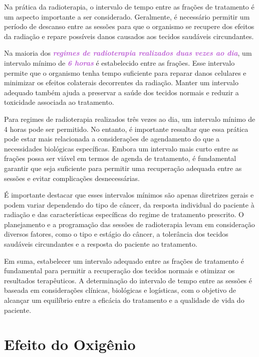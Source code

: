 \documentclass[11pt,a4paper]{article}
\begin{document}
	Na prática da radioterapia, o intervalo de tempo entre as frações de tratamento é um aspecto importante a ser considerado. Geralmente, é necessário permitir um período de descanso entre as sessões para que o organismo se recupere dos efeitos da radiação e repare possíveis danos causados aos tecidos saudáveis circundantes.

	Na maioria dos \textcolor{MediumOrchid}{\textbf{\textit{regimes de radioterapia realizados duas vezes ao dia}}}, um intervalo mínimo de \textcolor{MediumOrchid}{\textbf{\textit{6 horas}}} é estabelecido entre as frações. Esse intervalo permite que o organismo tenha tempo suficiente para reparar danos celulares e minimizar os efeitos colaterais decorrentes da radiação. Manter um intervalo adequado também ajuda a preservar a saúde dos tecidos normais e reduzir a toxicidade associada ao tratamento.

	Para regimes de radioterapia realizados três vezes ao dia, um intervalo mínimo de 4 horas pode ser permitido. No entanto, é importante ressaltar que essa prática pode estar mais relacionada a considerações de agendamento do que a necessidades biológicas específicas. Embora um intervalo mais curto entre as frações possa ser viável em termos de agenda de tratamento, é fundamental garantir que seja suficiente para permitir uma recuperação adequada entre as sessões e evitar complicações desnecessárias.

	É importante destacar que esses intervalos mínimos são apenas diretrizes gerais e podem variar dependendo do tipo de câncer, da resposta individual do paciente à radiação e das características específicas do regime de tratamento prescrito. O planejamento e a programação das sessões de radioterapia levam em consideração diversos fatores, como o tipo e estágio do câncer, a tolerância dos tecidos saudáveis circundantes e a resposta do paciente ao tratamento.

	Em suma, estabelecer um intervalo adequado entre as frações de tratamento é fundamental para permitir a recuperação dos tecidos normais e otimizar os resultados terapêuticos. A determinação do intervalo de tempo entre as sessões é baseada em considerações clínicas, biológicas e logísticas, com o objetivo de alcançar um equilíbrio entre a eficácia do tratamento e a qualidade de vida do paciente.

\section{Efeito do Oxigênio}
\end{document}
